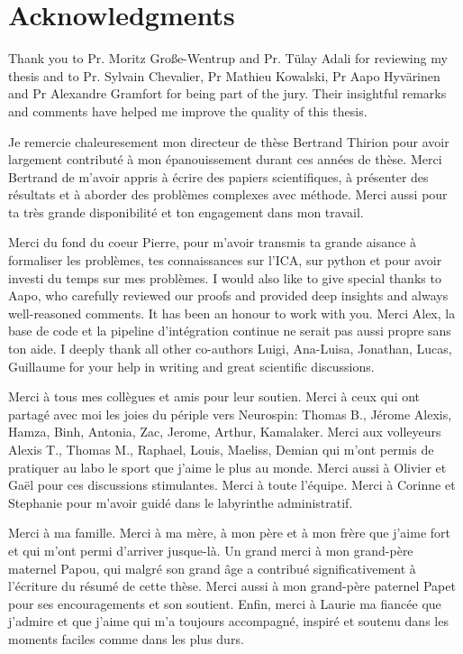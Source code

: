 
\bigskip

\begingroup
\let\clearpage\relax
\let\cleardoublepage\relax
\let\cleardoublepage\relax
\chapter*{Acknowledgments}
Thank you to Pr. Moritz Gro{\ss}e-Wentrup and Pr. T{\"u}lay Adali for reviewing
my thesis and to Pr. Sylvain Chevalier, Pr Mathieu Kowalski, Pr Aapo
Hyv{\"a}rinen and Pr Alexandre Gramfort for being part of the jury.
Their insightful remarks and comments have helped me improve the quality of this thesis.

Je remercie chaleuresement mon directeur de thèse Bertrand Thirion pour avoir
largement contributé à mon épanouissement durant ces années de thèse. Merci
Bertrand de m'avoir appris à écrire des papiers scientifiques,
à présenter des résultats et à aborder des problèmes complexes avec méthode.
Merci aussi pour ta très grande disponibilité et ton engagement dans mon travail.

Merci du fond du coeur Pierre, pour m'avoir transmis ta grande aisance à
formaliser les problèmes, tes connaissances sur l'ICA, sur python et pour avoir
investi du temps sur mes problèmes.
I would also like to give special thanks to Aapo, who carefully reviewed our proofs and provided deep insights and always well-reasoned comments. It has been an honour to work with you.
Merci Alex, la base de code et la pipeline d'intégration continue
ne serait pas aussi propre sans ton aide.
I deeply thank all other co-authors Luigi, Ana-Luisa, Jonathan, Lucas, Guillaume
for your help in writing and great scientific discussions.

Merci à tous mes collègues et amis pour leur soutien. Merci à ceux qui ont partagé avec moi les joies du
périple vers Neurospin: Thomas B., Jérome
Alexis, Hamza, Binh, Antonia, Zac, Jerome, Arthur, Kamalaker. Merci aux volleyeurs
Alexis T., Thomas M., Raphael, Louis, Maeliss, Demian qui m'ont permis de pratiquer au
labo le sport que j'aime le plus au monde.
Merci aussi à Olivier et Gaël pour ces discussions stimulantes.
Merci à toute l'équipe. Merci à Corinne et Stephanie pour m'avoir guidé dans le labyrinthe
administratif.

Merci à ma famille. Merci à ma mère, à mon père et à mon frère que j'aime fort
et qui m'ont permi d'arriver
jusque-là. Un grand merci à mon grand-père maternel Papou, qui malgré son grand âge a contribué significativement à l'écriture du résumé de cette thèse.
Merci aussi à mon grand-père paternel Papet pour ses encouragements et son soutient. 
Enfin, merci à Laurie ma fiancée que j'admire et que j'aime qui m'a toujours accompagné, inspiré et soutenu dans les moments faciles comme dans les plus durs.

\endgroup
